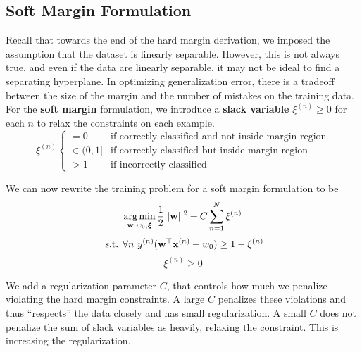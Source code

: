 \documentclass[11pt, letterpaper]{article}
\theoremstyle{definition}
\theoremstyle{plain}
\begin{document}
\subsection{Soft Margin Formulation}
Recall that towards the end of the hard margin derivation, we imposed the assumption that the dataset is linearly separable. However, this is not always true, and even if the data are linearly separable, it may not be ideal to find a separating hyperplane. In optimizing generalization error, there is a
tradeoff between the size of the margin and the number of mistakes on the training data. For the \textbf{soft margin} formulation, we introduce a \textbf{slack variable} $\xi^{(n)}
\geq 0$ for each $n$ to relax the constraints on each example.
%
$$
\xi^{(n)} \begin{cases}
      =0 & \text{if correctly classified and not inside margin region} \\
      \in (0,1] & \text{if correctly classified but inside margin
        region}\\
      >1 & \text{if incorrectly classified}
   \end{cases}
$$

\noindent We can now rewrite
the training problem
for a soft margin formulation to be
%
$$
\argmin_{\boldw, w_0, \bm \xi} \frac{1}{2}{||\boldw||^2} + C\sum_{n=1}^N \xi^{(n)} $$
$$\text{ s.t. }\forall n \text{ } y^{(n)}(\mathbf{w}^\top\mathbf{x}^{(n)}+w_0) \geq 1 - \xi^{(n)}$$
$$ \xi^{(n)} \geq 0$$


\noindent We add a regularization parameter $C$, that controls how much we
penalize violating the hard margin constraints.
A large $C$ penalizes these violations and thus
``respects'' the data closely and has small regularization.  A small
$C$ does not penalize the sum of slack variables as heavily, relaxing
the constraint. This is increasing the regularization.
\end{document}

